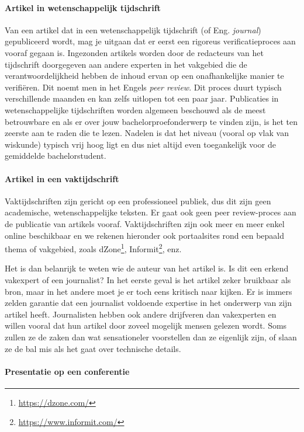 \paragraph{Artikel in wetenschappelijk tijdschrift}

Van een artikel dat in een wetenschappelijk tijdschrift (of Eng. \emph{journal}) gepubliceerd wordt, mag je uitgaan dat er eerst een rigoreus verificatieproces aan vooraf gegaan is. Ingezonden artikels worden door de redacteurs van het tijdschrift doorgegeven aan andere experten in het vakgebied die de verantwoordelijkheid hebben de inhoud ervan op een onafhankelijke manier te verifiëren. Dit noemt men in het Engels \emph{peer review}. Dit proces duurt typisch verschillende maanden en kan zelfs uitlopen tot een paar jaar. Publicaties in wetenschappelijke tijdschriften worden algemeen beschouwd als de meest betrouwbare en als er over jouw bachelorproefonderwerp te vinden zijn, is het ten zeerste aan te raden die te lezen. Nadelen is dat het niveau (vooral op vlak van wiskunde) typisch vrij hoog ligt en dus niet altijd even toegankelijk voor de gemiddelde bachelorstudent.

\paragraph{Artikel in een vaktijdschrift}

Vaktijdschriften zijn gericht op een professioneel publiek, dus dit zijn geen academische, wetenschappelijke teksten. Er gaat ook geen peer review-proces aan de publicatie van artikels vooraf. Vaktijdschriften zijn ook meer en meer enkel online beschikbaar en we rekenen hieronder ook portaalsites rond een bepaald thema of vakgebied, zoals dZone\footnote{\url{https://dzone.com/}}, Informit\footnote{\url{https://www.informit.com/}}, enz.

Het is dan belanrijk te weten wie de auteur van het artikel is. Is dit een erkend vakexpert of een journalist? In het eerste geval is het artikel zeker bruikbaar als bron, maar in het andere moet je er toch eens kritisch naar kijken. Er is immers zelden garantie dat een journalist voldoende expertise in het onderwerp van zijn artikel heeft. Journalisten hebben ook andere drijfveren dan vakexperten en willen vooral dat hun artikel door zoveel mogelijk mensen gelezen wordt. Soms zullen ze de zaken dan wat sensationeler voorstellen dan ze eigenlijk zijn, of slaan ze de bal mis als het gaat over technische details.

\paragraph{Presentatie op een conferentie}

